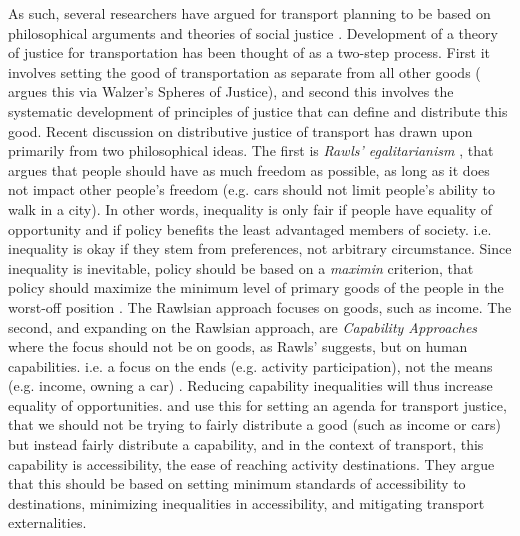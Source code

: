 As such, several researchers have argued for transport planning to be based on philosophical arguments and theories of social justice \cite{banister_inequality_2018,pereira_distributive_2017,martens_transport_2016}. Development of a theory of justice for transportation has been thought of as a two-step process. First it involves setting the good of transportation as separate from all other goods ( argues this via Walzer's Spheres of Justice), and second this involves the systematic development of principles of justice that can define and distribute this good. Recent discussion on distributive justice of transport has drawn upon primarily from two philosophical ideas. The first is \textit{Rawls' egalitarianism} \cite{rawls_theory_1971}, that argues that people should have as much freedom as possible, as long as it does not impact other people's freedom (e.g. cars should not limit people's ability to walk in a city). In other words, inequality is only fair if people have equality of opportunity and if policy benefits the least advantaged members of society. i.e. inequality is okay if they stem from preferences, not arbitrary circumstance. Since inequality is inevitable, policy should be based on a \textit{maximin} criterion, that policy should maximize the minimum level of primary goods of the people in the worst-off position \cite{martens_transport_2016}. The Rawlsian approach focuses on goods, such as income. The second, and expanding on the Rawlsian approach, are \textit{Capability Approaches} where the focus should not be on goods, as Rawls' suggests, but on human capabilities. i.e. a focus on the ends (e.g. activity participation), not the means (e.g. income, owning a car) \cite{sen_human_2005}. Reducing capability inequalities will thus increase equality of opportunities.  and  use this for setting an agenda for transport justice, that we should not be trying to fairly distribute a good (such as income or cars) but instead fairly distribute a capability, and in the context of transport, this capability is accessibility, the ease of reaching activity destinations. They argue that this should be based on setting minimum standards of accessibility to destinations, minimizing inequalities in accessibility, and mitigating transport externalities. 

